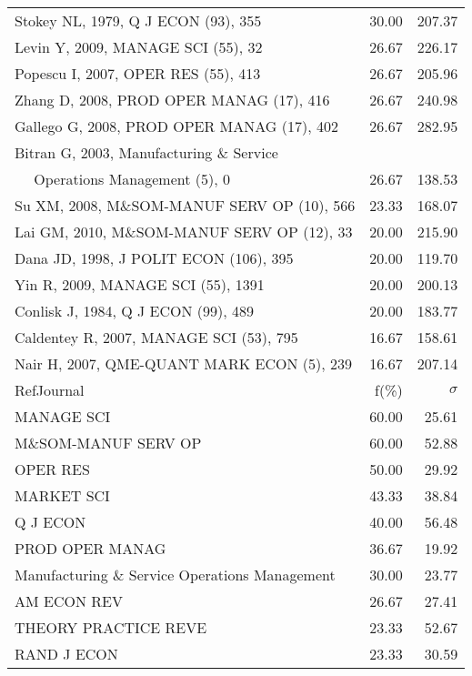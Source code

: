 \documentclass[a4paper,11pt]{report}
\begin{document}
\begin{landscape}
\begin{table}[!ht]
{\begin{tabular}{|l r r|}
Stokey NL, 1979, Q J ECON (93), 355 & 30.00 & 207.37\\
Levin Y, 2009, MANAGE SCI (55), 32 & 26.67 & 226.17\\
Popescu I, 2007, OPER RES (55), 413 & 26.67 & 205.96\\
Zhang D, 2008, PROD OPER MANAG (17), 416 & 26.67 & 240.98\\
Gallego G, 2008, PROD OPER MANAG (17), 402 & 26.67 & 282.95\\
Bitran G, 2003, Manufacturing \& Service &  & \\
$\quad$ Operations Management (5), 0 & 26.67 & 138.53\\
Su XM, 2008, M\&SOM-MANUF SERV OP (10), 566 & 23.33 & 168.07\\
Lai GM, 2010, M\&SOM-MANUF SERV OP (12), 33 & 20.00 & 215.90\\
Dana JD, 1998, J POLIT ECON (106), 395 & 20.00 & 119.70\\
Yin R, 2009, MANAGE SCI (55), 1391 & 20.00 & 200.13\\
Conlisk J, 1984, Q J ECON (99), 489 & 20.00 & 183.77\\
Caldentey R, 2007, MANAGE SCI (53), 795 & 16.67 & 158.61\\
Nair H, 2007, QME-QUANT MARK ECON (5), 239 & 16.67 & 207.14\\
\hline
\hline
RefJournal & f(\%) & $\sigma$\\
\hline
MANAGE SCI & 60.00 & 25.61\\
M\&SOM-MANUF SERV OP & 60.00 & 52.88\\
OPER RES & 50.00 & 29.92\\
MARKET SCI & 43.33 & 38.84\\
Q J ECON & 40.00 & 56.48\\
PROD OPER MANAG & 36.67 & 19.92\\
Manufacturing \& Service Operations Management & 30.00 & 23.77\\
AM ECON REV & 26.67 & 27.41\\
THEORY PRACTICE REVE & 23.33 & 52.67\\
RAND J ECON & 23.33 & 30.59\\
\hline
\end{tabular}
}
\end{table}

\clearpage


\end{landscape}
\end{document}
